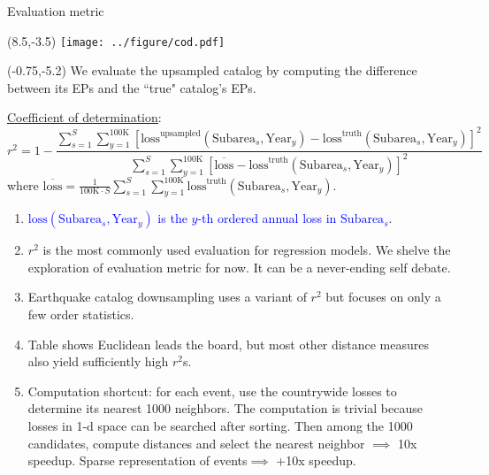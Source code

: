 \documentclass[aspectratio=169]{beamer}
\begin{document}
\begin{frame}{Evaluation metric}
\begin{textblock}{1}(8.5,-3.5)
\texttt{[image: ../figure/cod.pdf]}
\end{textblock}

\begin{textblock}{8.8}(-0.75,-5.2)
\tiny We evaluate the upsampled catalog by computing the difference between its EPs and the ``true" catalog's EPs.\smallskip

\underline{\textcolor{blue}{\href{https://en.wikipedia.org/wiki/Coefficient_of_determination}{Coefficient of determination}}}:\begin{equation*}
r^2 = 1 - \frac{ \sum_{s=1}^{S}\sum_{y=1}^{100\text{K}} \left[\text{loss}^{ \text{upsampled}}\left( \text{Subarea}_s, \text{Year}_y \right) - \text{loss}^{ \text{truth}}\left( \text{Subarea}_s, \text{Year}_y \right) \right] ^ 2  }{
\sum_{s=1}^{S}\sum_{y=1}^{100\text{K}} \left[\overline{\text{loss}} - \text{loss}^{ \text{truth}}\left( \text{Subarea}_s, \text{Year}_y \right) \right]^2 }
\end{equation*} where $\overline{\text{loss}} = \frac{1}{100\text{K}\cdot S} \sum_{s=1}^{S}\sum_{y=1}^{100\text{K}}\text{loss}^{ \text{truth}}\left( \text{Subarea}_s, \text{Year}_y \right)$.\medskip

\begin{enumerate}
\tiny\item \textcolor{blue}{$\text{loss}\left( \text{Subarea}_s, \text{Year}_y \right)$ is the $y$-th ordered annual loss in $\text{Subarea}_s$}.\medskip\pause

\tiny\item $r^2$ is the most commonly used evaluation for regression models. We shelve the exploration of evaluation metric for now. It can be a never-ending self debate.\medskip\pause

\tiny\item Earthquake catalog downsampling uses a variant of $r^2$ but focuses on only a few order statistics.\medskip\pause

\tiny\item Table shows Euclidean leads the board, but most other distance measures also yield sufficiently high $r^2$s.\smallskip\pause

\tiny\item Computation shortcut: for each event, use the countrywide losses to determine its nearest 1000 neighbors. The computation is trivial because losses in 1-d space can be searched after sorting. Then among the 1000 candidates, compute distances and select the nearest neighbor $\implies$ 10x speedup. Sparse representation of events$\implies$ +10x speedup.

\end{enumerate}
\end{textblock}
\end{frame}
\end{document}
